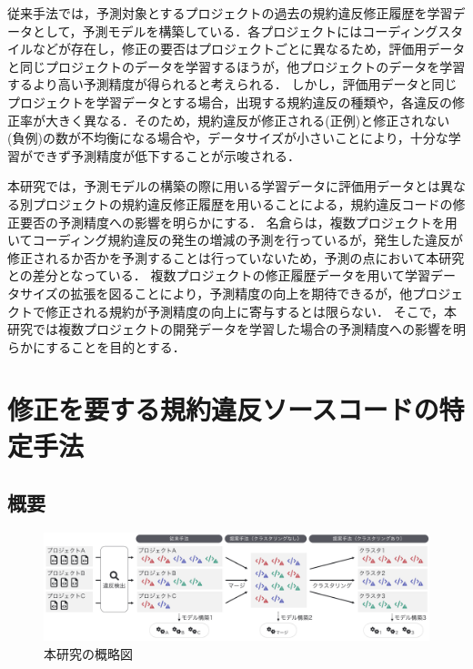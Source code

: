 \documentclass[submit,noauthor,ses,dvipdfmx]{ipsj}
\begin{document}
従来手法では，予測対象とするプロジェクトの過去の規約違反修正履歴を学習データとして，予測モデルを構築している．各プロジェクトにはコーディングスタイルなどが存在し，修正の要否はプロジェクトごとに異なるため，評価用データと同じプロジェクトのデータを学習するほうが，他プロジェクトのデータを学習するより高い予測精度が得られると考えられる．
しかし，評価用データと同じプロジェクトを学習データとする場合，出現する規約違反の種類や，各違反の修正率が大きく異なる\cite{Panichella}．そのため，規約違反が修正される(正例)と修正されない(負例)の数が不均衡になる場合や，データサイズが小さいことにより，十分な学習ができず予測精度が低下することが示唆される．

本研究では，予測モデルの構築の際に用いる学習データに評価用データとは異なる別プロジェクトの規約違反修正履歴を用いることによる，規約違反コードの修正要否の予測精度への影響を明らかにする．
名倉らは，複数プロジェクトを用いてコーディング規約違反の発生の増減の予測を行っているが，発生した違反が修正されるか否かを予測することは行っていないため，予測の点において本研究との差分となっている\cite{nagura}．
複数プロジェクトの修正履歴データを用いて学習データサイズの拡張を図ることにより，予測精度の向上を期待できるが，他プロジェクトで修正される規約が予測精度の向上に寄与するとは限らない．
そこで，本研究では複数プロジェクトの開発データを学習した場合の予測精度への影響を明らかにすることを目的とする．

\section{修正を要する規約違反ソースコードの特定手法}\label{chap:approach}

\subsection{概要}

\begin{figure}[t]
	\centering
	\includegraphics[width=0.8\linewidth]{Kameoka_fig/kameoka_fig1.pdf}
	\caption{本研究の概略図}
	\label{fig:Teiannsyuhou}
\end{figure}
\end{document}
